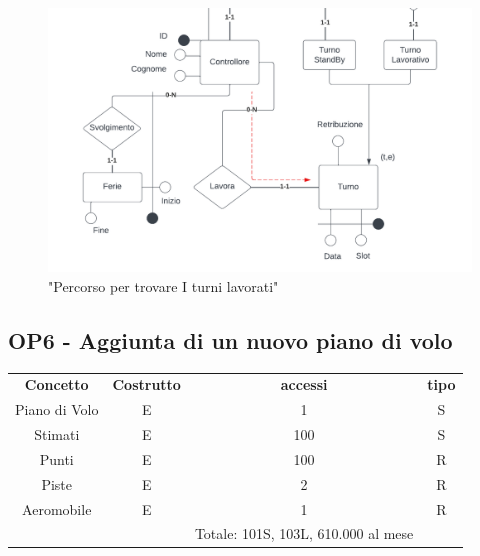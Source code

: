     \begin{figure}[H]
      \centering
      \includegraphics[width=1\textwidth]{figures/BasicControllerarrowsp2.pdf}
      \caption{"Percorso per trovare I turni lavorati"}
    \end{figure}

    \subsection*{OP6 - Aggiunta di un nuovo piano di volo}
    \begin{table}[H]
    \centering
    \begin{tabular}{cccc}
  
    \rowcolor{tableheadercolor}
    \textbf{Concetto} & \textbf{Costrutto} & \textbf{accessi} & \textbf{tipo}\\
  
    Piano di Volo & E & 1 & S \\
    Stimati & E & 100 & S \\
    Punti & E & 100 & R \\
    Piste & E & 2 & R \\
    Aeromobile & E & 1 & R \\
    & & Totale: 101S, 103L, 610.000 al mese &\\
  
    \end{tabular}
    \end{table}


